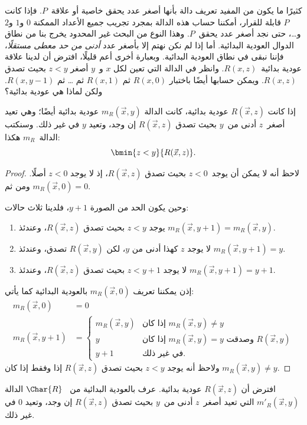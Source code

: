 \documentclass[../../../include/open-logic-section]{subfiles}
\begin{document}

\begin{explain}
كثيرًا ما يكون من المفيد تعريف دالة بأنها أصغر عدد يحقق خاصية أو
علاقة~$P$. فإذا كانت $P$ قابلة للقرار، أمكننا حساب هذه الدالة بمجرد
تجريب جميع الأعداد الممكنة $0$ و$1$ و$2$ و…، حتى نجد أصغر عدد
يحقق~$P$. وهذا النوع من البحث غير المحدود يخرج بنا من نطاق الدوال
العودية البدائية. أما إذا لم نكن نهتم إلا بأصغر عدد
\emph{أدنى من حد معطى مستقلًا}، فإننا نبقى في نطاق العودية البدائية.
وبعبارة أخرى أعم قليلًا، افترض أن لدينا علاقة عودية بدائية~$R(x,z)$.
وانظر في الدالة التي تعين لكل $x$ و~$y$ أصغر $z<y$ بحيث تصدق
$R(x,z)$. ويمكن حسابها أيضًا باختبار $R(x,0)$ ثم $R(x,1)$ ثم … ثم
$R(x,y-1)$. ولكن لماذا هي عودية بدائية؟
\end{explain}

\begin{prop}
إذا كانت $R(\vec x,z)$ عودية بدائية، كانت الدالة $m_R(\vec{x},y)$
عودية بدائية أيضًا؛ وهي تعيد أصغر~$z$ أدنى من~$y$ بحيث تصدق
$R(\vec x,z)$ إن وجد، وتعيد $y$ في غير ذلك. وسنكتب الدالة~$m_R$ هكذا:
\[
\bmin{z < y}{R(\vec{x}, z)}.
\]
\end{prop}

\begin{proof}
لاحظ أنه لا يمكن أن يوجد~$z<0$ بحيث تصدق $R(\vec{x},z)$، إذ لا يوجد
$z<0$ أصلًا. ومن ثم $m_R(\vec x,0)=0$.

وحين يكون الحد من الصورة $y+1$، فلدينا ثلاث حالات:
\begin{enumerate}
\item يوجد $z<y$ بحيث تصدق $R(\vec{x},z)$، وعندئذ
$m_R(\vec{x},y+1)=m_R(\vec{x},y)$.
\item لا يوجد $z$ كهذا أدنى من $y$، لكن $R(\vec{x},y)$ تصدق، وعندئذ
$m_R(\vec{x},y+1)=y$.
\item لا يوجد $z<y+1$ بحيث تصدق $R(\vec{x},z)$، وعندئذ
$m_R(\vec{x},y+1)=y+1$.
\end{enumerate}
إذن يمكننا تعريف $m_R(\vec x,0)$ بالعودية البدائية كما يأتي:
\begin{align*}
m_R(\vec{x}, 0) & = 0\\
m_R(\vec{x}, y+1) & =
\begin{cases}
m_R(\vec{x}, y) & \text{إذا كان $m_R(\vec x, y) \neq y$}\\
y & \text{إذا كان $m_R(\vec x, y) = y$ وصدقت $R(\vec{x}, y)$}\\
y+1 & \text{في غير ذلك.}
\end{cases}
\end{align*}
ولاحظ أنه يوجد $z<y$ بحيث تصدق $R(\vec x,z)$ إذا وفقط إذا كان
$m_R(\vec x,y)\neq y$.
\end{proof}

\begin{prob}
افترض أن $R(\vec x,z)$ عودية بدائية. عرف بالعودية البدائية من
~$\Char{R}$ الدالة $m'_R(\vec{x},y)$ التي تعيد أصغر~$z$ أدنى من~$y$
بحيث تصدق $R(\vec{x},z)$ إن وجد، وتعيد $0$ في غير ذلك.
\end{prob}
\end{document}
